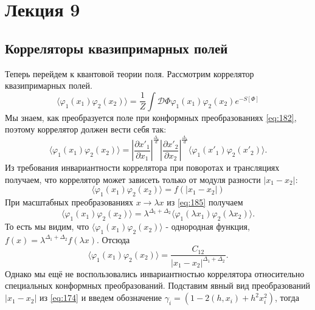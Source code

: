 \documentclass[a4paper,12pt]{article}
\theoremstyle{definition}
\theoremstyle{definition}
\theoremstyle{definition}
\begin{document}
\section{Лекция 9}
\label{sec:lecture-9}

\subsection{Корреляторы квазипримарных полей}
\label{sec:quasiprimary-correlators}

Теперь перейдем к квантовой теории поля. Рассмотрим коррелятор квазипримарных полей.
\begin{equation}
  \label{eq:184}
  \langle \varphi_{1}(x_{1}) \varphi_{2}(x_{2})\rangle = \frac{1}{Z} \int \mathcal{D} \Phi \varphi_{1}(x_{1})\varphi_{2}(x_{2}) e^{-S[\Phi]}
\end{equation}
Мы знаем, как преобразуется поле при конформных преобразованиях \eqref{eq:182}, поэтому коррелятор должен вести себя так:
\begin{equation}
  \label{eq:185}
  \langle \varphi_{1}(x_{1})\varphi_{2}(x_{2})\rangle = \left|\frac{\partial x'_{1}}{\partial x_{1}}\right|^{\frac{\Delta_{1}}{d}}\left| \frac{\partial x'_{2}}{\partial x_{2}}\right|^{\frac{\Delta_{1}}{d}} \langle \varphi_{1}(x'_{1})\varphi_{2}(x'_{2})\rangle .
\end{equation}
Из требования инвариантности коррелятора при поворотах и трансляциях получаем, что коррелятор может зависеть только от модуля разности $\left|x_{1}-x_{2}\right|$:
\begin{equation}
  \label{eq:186}
  \langle \varphi_{1}(x_{1}) \varphi_{2}(x_{2})\rangle = f(\left|x_{1}-x_{2}\right|)
\end{equation}
При масштабных преобразованиях $x\to \lambda x$ из \eqref{eq:185} получаем
\begin{equation}
  \label{eq:187}
   \langle \varphi_{1}(x_{1}) \varphi_{2}(x_{2})\rangle=\lambda^{\Delta_{1}+\Delta_{2}}  \langle \varphi_{1}(\lambda x_{1}) \varphi_{2}(\lambda x_{2})\rangle .
\end{equation}
То есть мы видим, что $ \langle \varphi_{1}(x_{1}) \varphi_{2}(x_{2})\rangle$ - однородная функция, $f(x)=\lambda^{\Delta_{1}+\Delta_{2}} f(\lambda x)$. Отсюда
\begin{equation}
  \label{eq:188}
   \langle \varphi_{1}(x_{1}) \varphi_{2}(x_{2})\rangle = \frac{C_{12}}{\left|x_{1}-x_{2}\right|^{\Delta_{1}+\Delta_{2}}}.
\end{equation}
Однако мы ещё не воспользовались инвариантностью коррелятора относительно специальных конформных преобразований. Подставим явный вид преобразований $\left|x_{1}-x_{2}\right|$ из \eqref{eq:174} и введем обозначение $\gamma_{i}=\left(1-2(h,x_{i})+h^{2}x_{i}^{2}\right)$, тогда
\end{document}
